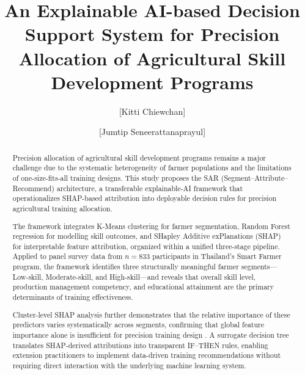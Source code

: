 \documentclass[3p,twocolumn,authoryear]{elsarticle}
\begin{document}
\begin{frontmatter}

\title{An Explainable AI-based Decision Support System for Precision
       Allocation of Agricultural Skill Development Programs}

\author[inst1]{[Kitti Chiewchan]}
\author[inst2]{[Jumtip Seneerattanaprayul]}

\address[inst1]{Computer Education, Faculty of Education,
  Bansomdejchaopraya Rajabhat University,
  1061 Issaraphap Road, Hirunrujee, Thonburi, Bangkok 10600, Thailand}
\address[inst2]{Department of Agricultural Economics,
  Faculty of Economics, Kasetsart University,
  50 Ngam Wong Wan Road, Ladyao, Jatujak, Bangkok 10110, Thailand}

\begin{abstract}

Precision allocation of agricultural skill development programs remains
a major challenge due to the systematic heterogeneity of farmer
populations and the limitations of one-size-fits-all training designs.
This study proposes the SAR (Segment--Attribute--Recommend) architecture,
a transferable explainable-AI framework that operationalizes SHAP-based
attribution into deployable decision rules for precision agricultural
training allocation.

The framework integrates K-Means clustering for farmer segmentation,
Random Forest regression for modelling skill outcomes, and SHapley
Additive exPlanations (SHAP) for interpretable feature attribution,
organized within a unified three-stage pipeline.
Applied to panel survey data from $n = 833$ participants in Thailand's
Smart Farmer program, the framework identifies three structurally
meaningful farmer segments---Low-skill, Moderate-skill, and High-skill---and
reveals that overall skill level, production management competency, and
educational attainment are the primary determinants of training effectiveness.

Cluster-level SHAP analysis further demonstrates that the relative
importance of these predictors varies systematically across segments,
confirming that global feature importance alone is insufficient for
precision training design \citep{lundberg2020}.
A surrogate decision tree translates SHAP-derived attributions into
transparent IF--THEN rules, enabling extension practitioners to implement
data-driven training recommendations without requiring direct interaction
with the underlying machine learning system.


\end{abstract}
\end{frontmatter}
\end{document}
